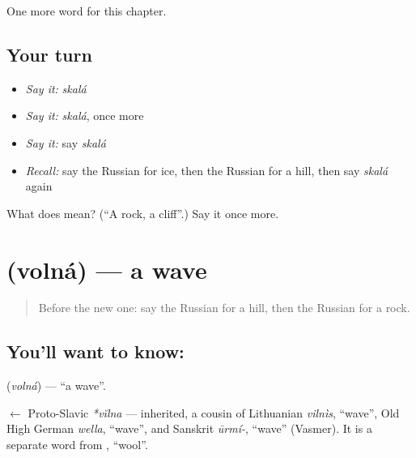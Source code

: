 \begin{grammarlens}[title={What you've built}]
One more word for this chapter.
\end{grammarlens}

\subsection*{Your turn}
\begin{itemize}
\raggedright
  \item \emph{Say it:} \emph{skalá}
  \item \emph{Say it:} \emph{skalá}, once more
  \item \emph{Say it:} say \emph{skalá}
  \item \emph{Recall:} say the Russian for ice, then the Russian for a hill, then say \emph{skalá} again
\end{itemize}

\begin{tcolorbox}[breakable,colback=teal!4,colframe=teal!35!black,title={Before you move on}]
What does  mean? (\textquotedblleft{}A rock, a cliff\textquotedblright{}.) Say it once more.
\end{tcolorbox}
\section[\texorpdfstring{\ru{волна} (volná)}{волна (volná)}]{ (volná) — a wave}

\label{lesson:RU-C115-wave}



\begin{quote}
Before the new one: say the Russian for a hill, then the Russian for a rock.
\end{quote}

\subsection*{You'll want to know: }
\textbf{} (\emph{volná}) — \textquotedblleft{}a wave\textquotedblright{}.

\begin{cousinweb}
\textbf{} $\leftarrow$ Proto-Slavic \emph{*vĭlna} — inherited, a cousin of Lithuanian \emph{vilnìs}, \textquotedblleft{}wave\textquotedblright{}, Old High German \emph{wella}, \textquotedblleft{}wave\textquotedblright{}, and Sanskrit \emph{ūrmí-}, \textquotedblleft{}wave\textquotedblright{} (Vasmer). It is a separate word from \emph{}, \textquotedblleft{}wool\textquotedblright{}.
\end{cousinweb}

